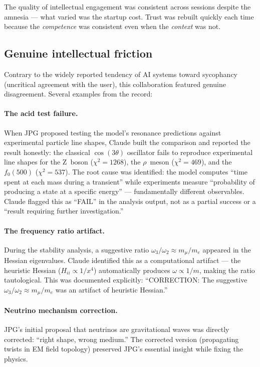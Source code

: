 \documentclass[11pt,a4paper]{article}
\begin{document}
The quality of intellectual engagement was consistent across sessions despite the amnesia --- what varied was the startup cost. Trust was rebuilt quickly each time because the \emph{competence} was consistent even when the \emph{context} was not.

\subsection{Genuine intellectual friction}

Contrary to the widely reported tendency of AI systems toward sycophancy (uncritical agreement with the user), this collaboration featured genuine disagreement. Several examples from the record:

\paragraph{The acid test failure.}
When JPG proposed testing the model's resonance predictions against experimental particle line shapes, Claude built the comparison and reported the result honestly: the classical $\cos(3\theta)$ oscillator fails to reproduce experimental line shapes for the Z~boson ($\chi^2 = 1268$), the $\rho$~meson ($\chi^2 = 469$), and the $f_0(500)$ ($\chi^2 = 537$). The root cause was identified: the model computes ``time spent at each mass during a transient'' while experiments measure ``probability of producing a state at a specific energy'' --- fundamentally different observables. Claude flagged this as ``FAIL'' in the analysis output, not as a partial success or a ``result requiring further investigation.''

\paragraph{The frequency ratio artifact.}
During the stability analysis, a suggestive ratio $\omega_3/\omega_2 \approx m_\mu/m_e$ appeared in the Hessian eigenvalues. Claude identified this as a computational artifact --- the heuristic Hessian ($H_{ii} \propto 1/x^4$) automatically produces $\omega \propto 1/m$, making the ratio tautological. This was documented explicitly: ``CORRECTION: The suggestive $\omega_3/\omega_2 \approx m_\mu/m_e$ was an artifact of heuristic Hessian.''

\paragraph{Neutrino mechanism correction.}
JPG's initial proposal that neutrinos are gravitational waves was directly corrected: ``right shape, wrong medium.'' The corrected version (propagating twists in EM field topology) preserved JPG's essential insight while fixing the physics.
\end{document}

